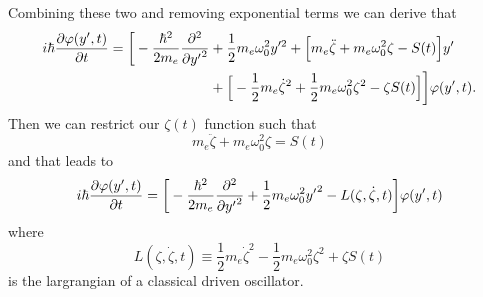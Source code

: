 Combining these two and removing exponential terms we can derive that
\begin{equation} \label{1.39}
  \begin{aligned}
    i \hbar \pdv{\varphi(y',t)}{t}   =
    \bigg[
        -  \frac{\hbar^2}{2m_e}\pdv[2]{{y'}}
        & + \frac{1}{2} m_e \omega_0^2 y'^2 +
        \Big[
            m_e\ddot{\zeta} + m_e\omega_0^2\zeta - S(t)
        \Big]y' \\
        &
        +
        \Big[
            - \frac{1}{2} m_e\dot{\zeta}^2 + \frac{1}{2}m_e\omega_0^2 \zeta^2 - \zeta S(t)
        \Big]
    \bigg]\varphi(y',t).
  \end{aligned}
\end{equation}
Then we can restrict our $\zeta(t)$ function such that
\begin{equation} \label{1.40}
  m_e\ddot{\zeta} + m_e\omega_0^2\zeta = S(t)
\end{equation}
and that leads to
\begin{equation} \label{1.41}
  \begin{aligned}
    i \hbar \pdv{\varphi(y',t)}{t}   =
    \bigg[
        -  \frac{\hbar^2}{2m_e}\pdv[2]{{y'}}
        + \frac{1}{2} m_e \omega_0^2 {y'}^2
        - L(\zeta,\dot{\zeta},t)
    \bigg]\varphi(y',t)
  \end{aligned}
\end{equation}
where
\begin{equation} \label{1.42}
  L(\zeta,\dot{\zeta},t) \equiv \frac{1}{2} m_e\dot{\zeta}^2 - \frac{1}{2}m_e\omega_0^2 \zeta^2 + \zeta S(t)
\end{equation}
is the largrangian of a classical driven oscillator.

